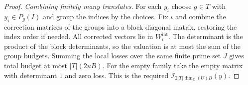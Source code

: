 \begin{proof}
\emph{Combining finitely many translates.}
For each $y_i$ choose $g\in T$ with $y_i\in P_g(I)$ and group the indices by the choices. Fix $\iota$ and combine the correction matrices of the groups into a block diagonal matrix, restoring the index order if needed. All corrected vectors lie in $W_\iota^{\mathrm{int}}$. The determinant is the product of the block determinants, so the valuation is at most the sum of the group budgets. Summing the local losses over the same finite prime set $J$ gives total budget at most $|T|(2uB)$. For the empty family take the empty matrix with determinant $1$ and zero loss. This is the required $\mathcal I_{2|T|\dim_{\mathbb C}(U)B}(y)$.
\end{proof}
